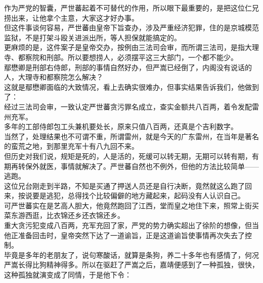 \begin{multicols}{\theparacolNo}
作为严党的智囊，严世蕃起着不可替代的作用，所以眼下最重要的，是把这位仁兄捞出来，让他拿个主意，大家这才好办事。\\

但这件事谈何容易，严世蕃由皇帝下旨查办，涉及严重经济犯罪，住的是京城模范监狱，不是打架斗殴关进派出所，等人担保就能搞定的。\\

更麻烦的是，这件案子是皇帝交办，按例由三法司会审，而所谓三法司，是指大理寺、都察院和刑部。所以要想捞人，必须摆平这三大部门，一个都不能少。\\

鄢懋卿是刑部右侍郎，刑部的事情自然好办，但严嵩已经倒了，内阁没有说话的人，大理寺和都察院怎么解决？\\

这就是鄢懋卿面临的大致情况，看上去确实很难办，但事实结果告诉我们，他做到了：\\

经过三法司会审，一致认定严世蕃贪污罪名成立，查实金额共八百两，着令发配雷州充军。\\

多年的工部侍郎包工头兼机要处长，原来只值八百两，还真是个吉利数字。\\

当然了，处理结果也不可谓不重，所谓雷州，就是今天的广东雷州，在当年是著名的蛮荒之地，到那里充军十有八九回不来。\\

但历史对我们说，规矩是死的，人是活的，死缓可以转无期，无期可以转有期，有期再转保外就医，事情就解决了。严世蕃自然也不例外，但他的方法比较简单——逃跑。\\

这位兄台刚走到半路，不知是买通了押送人员还是自行决断，竟然就这么跑了回来，按说要是逃犯，总得找个比较偏僻的地方藏起来，起码没有人认识自己。\\

可严世蕃实在是艺高人胆大，他竟然跑回了江西，堂而皇之地住下来，照常上街买菜东游西逛，比衣锦还乡还衣锦还乡。\\

重大贪污犯变成八百两，充军充回了家，严党的势力确实超出了徐阶的想像，但当他正准备回击时，皇帝突然下达了一道谕旨，正是这道谕旨使事情再次失去了控制。\\

毕竟是多年的老朋友了，说句寒酸话，就算是条狗，养二十多年也有感情了，何况严嵩长得比狗精神得多。所以在驱赶了严嵩之后，嘉靖便感到了一种孤独，很快，这种孤独就演变成了同情，于是他下令：\\


\end{multicols}
